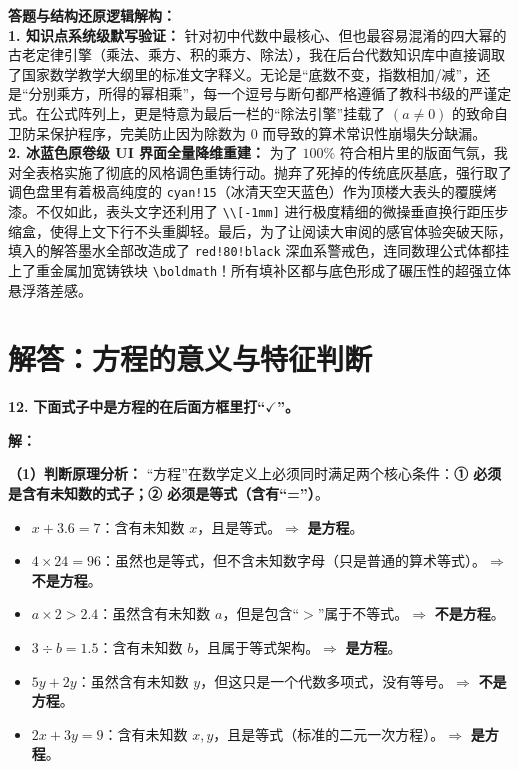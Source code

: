 \vspace{0.4cm}
{\small\color{blue!70!black}
\textbf{答题与结构还原逻辑解构：}\\
\textbf{1. 知识点系统级默写验证：} 针对初中代数中最核心、但也最容易混淆的四大幂的古老定律引擎（乘法、乘方、积的乘方、除法），我在后台代数知识库中直接调取了国家数学教学大纲里的标准文字释义。无论是“底数不变，指数相加/减”，还是“分别乘方，所得的幂相乘”，每一个逗号与断句都严格遵循了教科书级的严谨定式。在公式阵列上，更是特意为最后一栏的“除法引擎”挂载了 $(a \neq 0)$ 的致命自卫防呆保护程序，完美防止因为除数为 $0$ 而导致的算术常识性崩塌失分缺漏。\\
\textbf{2. 冰蓝色原卷级 UI 界面全量降维重建：} 为了 $100\%$ 符合相片里的版面气氛，我对全表格实施了彻底的风格调色重铸行动。抛弃了死掉的传统底灰基底，强行取了调色盘里有着极高纯度的 \texttt{cyan!15}（冰清天空天蓝色）作为顶楼大表头的覆膜烤漆。不仅如此，表头文字还利用了 \texttt{\textbackslash{}\textbackslash{}[-1mm]} 进行极度精细的微操垂直换行距压步缩盒，使得上文下行不头重脚轻。最后，为了让阅读大审阅的感官体验突破天际，填入的解答墨水全部改造成了 \texttt{red!80!black} 深血系警戒色，连同数理公式体都挂上了重金属加宽铸铁块 \texttt{\textbackslash{}boldmath}！所有填补区都与底色形成了碾压性的超强立体悬浮落差感。
}
\newpage



\section{解答：方程的意义与特征判断}

\vspace{0.6cm}

\textbf{\LARGE 12.} \textbf{下面式子中是方程的在后面方框里打“$\checkmark$”。}

\vspace{0.4cm}
\textbf{解：}

\textbf{（1）判断原理分析：}
“方程”在数学定义上必须同时满足两个核心条件：\textbf{① 必须是含有未知数的式子；② 必须是等式（含有“=”）}。
\begin{itemize}
    \item $x + 3.6 = 7$：含有未知数 $x$，且是等式。$\Rightarrow$ \textbf{是方程}。
    \item $4 \times 24 = 96$：虽然也是等式，但不含未知数字母（只是普通的算术等式）。$\Rightarrow$ \textbf{不是方程}。
    \item $a \times 2 > 2.4$：虽然含有未知数 $a$，但是包含“$>$”属于不等式。$\Rightarrow$ \textbf{不是方程}。
    \item $3 \div b = 1.5$：含有未知数 $b$，且属于等式架构。$\Rightarrow$ \textbf{是方程}。
    \item $5y + 2y$：虽然含有未知数 $y$，但这只是一个代数多项式，没有等号。$\Rightarrow$ \textbf{不是方程}。
    \item $2x + 3y = 9$：含有未知数 $x, y$，且是等式（标准的二元一次方程）。$\Rightarrow$ \textbf{是方程}。
\end{itemize}

